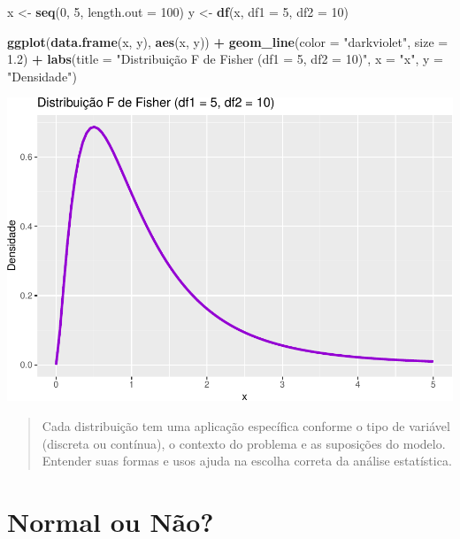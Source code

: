 \documentclass[
]{book}
\newenvironment{Shaded}{\begin{snugshade}}{\end{snugshade}}
\newcommand{\AttributeTok}[1]{\textcolor[rgb]{0.13,0.29,0.53}{#1}}
\newcommand{\DecValTok}[1]{\textcolor[rgb]{0.00,0.00,0.81}{#1}}
\newcommand{\FloatTok}[1]{\textcolor[rgb]{0.00,0.00,0.81}{#1}}
\newcommand{\FunctionTok}[1]{\textcolor[rgb]{0.13,0.29,0.53}{\textbf{#1}}}
\newcommand{\NormalTok}[1]{#1}
\newcommand{\OtherTok}[1]{\textcolor[rgb]{0.56,0.35,0.01}{#1}}
\newcommand{\SpecialCharTok}[1]{\textcolor[rgb]{0.81,0.36,0.00}{\textbf{#1}}}
\newcommand{\StringTok}[1]{\textcolor[rgb]{0.31,0.60,0.02}{#1}}
\begin{document}
\begin{Shaded}
\begin{Highlighting}[]
\NormalTok{x }\OtherTok{\textless{}{-}} \FunctionTok{seq}\NormalTok{(}\DecValTok{0}\NormalTok{, }\DecValTok{5}\NormalTok{, }\AttributeTok{length.out =} \DecValTok{100}\NormalTok{)}
\NormalTok{y }\OtherTok{\textless{}{-}} \FunctionTok{df}\NormalTok{(x, }\AttributeTok{df1 =} \DecValTok{5}\NormalTok{, }\AttributeTok{df2 =} \DecValTok{10}\NormalTok{)}

\FunctionTok{ggplot}\NormalTok{(}\FunctionTok{data.frame}\NormalTok{(x, y), }\FunctionTok{aes}\NormalTok{(x, y)) }\SpecialCharTok{+}
  \FunctionTok{geom\_line}\NormalTok{(}\AttributeTok{color =} \StringTok{"darkviolet"}\NormalTok{, }\AttributeTok{size =} \FloatTok{1.2}\NormalTok{) }\SpecialCharTok{+}
  \FunctionTok{labs}\NormalTok{(}\AttributeTok{title =} \StringTok{"Distribuição F de Fisher (df1 = 5, df2 = 10)"}\NormalTok{, }\AttributeTok{x =} \StringTok{"x"}\NormalTok{, }\AttributeTok{y =} \StringTok{"Densidade"}\NormalTok{)}
\end{Highlighting}
\end{Shaded}

\includegraphics{LivroEstatisticaR_files/figure-latex/fisherDist-1.pdf}

\begin{quote}
Cada distribuição tem uma aplicação específica conforme o tipo de variável (discreta ou contínua), o contexto do problema e as suposições do modelo. Entender suas formas e usos ajuda na escolha correta da análise estatística.
\end{quote}

\chapter{Normal ou Não?}\label{normal-ou-nuxe3o}
\end{document}
